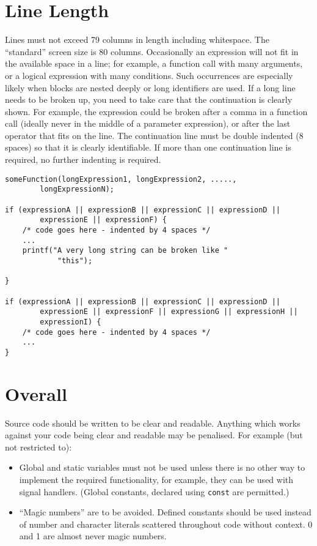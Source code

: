 \documentclass{article}
\begin{document}
\section{Line Length}
Lines must not exceed 79 columns in length including whitespace.
The ``standard'' screen size is 80 columns.
Occasionally an expression will not fit in the available space in a line; for example, a function call with many arguments, or a logical expression with many conditions.
Such occurrences are especially likely when blocks are nested deeply or long identifiers are used.
If a long line needs to be broken up, you need to take care that the continuation is clearly shown.
For example, the expression could be broken after a comma in a function call (ideally never in the middle of a parameter expression), or after the last operator that fits on the line.
The continuation line must be double indented (8 spaces) so that it is clearly identifiable.
If more than one continuation line is required, no further indenting is required.
\clearpage
{}
\nolinenumbers
\begin{lstlisting}
someFunction(longExpression1, longExpression2, .....,
        longExpressionN);

if (expressionA || expressionB || expressionC || expressionD ||
        expressionE || expressionF) {
    /* code goes here - indented by 4 spaces */
    ...
    printf("A very long string can be broken like "
            "this");

}

if (expressionA || expressionB || expressionC || expressionD ||
        expressionE || expressionF || expressionG || expressionH ||
        expressionI) {
    /* code goes here - indented by 4 spaces */
    ...
}
\end{lstlisting}
\linenumbers

\section{Overall}
\label{sec:overall}
Source code should be written to be clear and readable.
Anything which works against your code being clear and readable may be penalised.
For example (but not restricted to):
\begin{itemize}
\item Global and static variables must not be used unless there is no other way to implement the required functionality, for example, 
they can be used with signal handlers. (Global constants, declared using \texttt{const} are permitted.)
\item ``Magic numbers'' are to be avoided. Defined constants should be used instead of number and character literals scattered throughout code without context. 0 and 1 are almost never magic numbers.
\end{itemize}
\nolinenumbers
\end{document}
